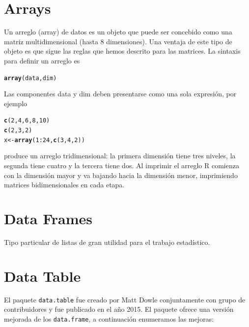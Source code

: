 \documentclass[11pt,a4paper,oneside]{book}\usepackage[]{graphicx}\usepackage[]{color}
\makeatletter
\newcommand{\hlnum}[1]{\textcolor[rgb]{0.686,0.059,0.569}{#1}}%
\newcommand{\hlopt}[1]{\textcolor[rgb]{0,0,0}{#1}}%
\newcommand{\hlstd}[1]{\textcolor[rgb]{0.345,0.345,0.345}{#1}}%
\newcommand{\hlkwb}[1]{\textcolor[rgb]{0.69,0.353,0.396}{#1}}%
\newcommand{\hlkwd}[1]{\textcolor[rgb]{0.737,0.353,0.396}{\textbf{#1}}}%
\newenvironment{kframe}{%
 \def\at@end@of@kframe{}%
 \ifinner\ifhmode%
  \def\at@end@of@kframe{\end{minipage}}%
  \begin{minipage}{\columnwidth}%
 \fi\fi%
 \def\FrameCommand##1{\hskip\@totalleftmargin \hskip-\fboxsep
 \colorbox{shadecolor}{##1}\hskip-\fboxsep
     \hskip-\linewidth \hskip-\@totalleftmargin \hskip\columnwidth}%
 \MakeFramed {\advance\hsize-\width
   \@totalleftmargin\z@ \linewidth\hsize
   \@setminipage}}%
 {\par\unskip\endMakeFramed%
 \at@end@of@kframe}
\newenvironment{knitrout}{}{} %
\makeatother
\begin{document}
\begin{itemize}
\section{Arrays}
Un arreglo (array) de datos es un objeto que puede ser concebido como una matriz multidimensional (hasta 8 dimensiones). Una ventaja de este tipo de objeto es que sigue las reglas que hemos descrito para las matrices. La sintaxis para definir un arreglo es
\begin{knitrout}
\color{fgcolor}\begin{kframe}
\begin{alltt}
\hlkwd{array}\hlstd{(data, dim)}
\end{alltt}
\end{kframe}
\end{knitrout}
Las componentes data y dim deben presentarse como una sola expresión, por ejemplo
\begin{knitrout}
\color{fgcolor}\begin{kframe}
\begin{alltt}
\hlkwd{c}\hlstd{(}\hlnum{2}\hlstd{,}\hlnum{4}\hlstd{,}\hlnum{6}\hlstd{,}\hlnum{8}\hlstd{,}\hlnum{10}\hlstd{)}
\hlkwd{c}\hlstd{(}\hlnum{2}\hlstd{,}\hlnum{3}\hlstd{,}\hlnum{2}\hlstd{)}
\hlstd{x} \hlkwb{<-} \hlkwd{array} \hlstd{(}\hlnum{1}\hlopt{:}\hlnum{24}\hlstd{,} \hlkwd{c}\hlstd{(}\hlnum{3}\hlstd{,}\hlnum{4}\hlstd{,}\hlnum{2}\hlstd{))}
\end{alltt}
\end{kframe}
\end{knitrout}

produce un arreglo tridimensional: la primera dimensión tiene tres niveles, la segunda tiene cuatro y la tercera tiene dos. Al imprimir el arreglo R comienza con la dimensión mayor y va bajando hacia la dimensión menor, imprimiendo matrices bidimensionales en cada etapa.

\section{Data Frames}
Tipo particular de listas de gran utilidad para el trabajo estadístico.



\section{Data Table}

El paquete \texttt{data.table} fue creado por Matt Dowle conjuntamente con grupo de contribuidores y fue publicado en el año 2015. El paquete ofrece una versión mejorada de los \texttt{data.frame}, a continuación enumeramos las mejoras:


\end{itemize}
\end{document}

